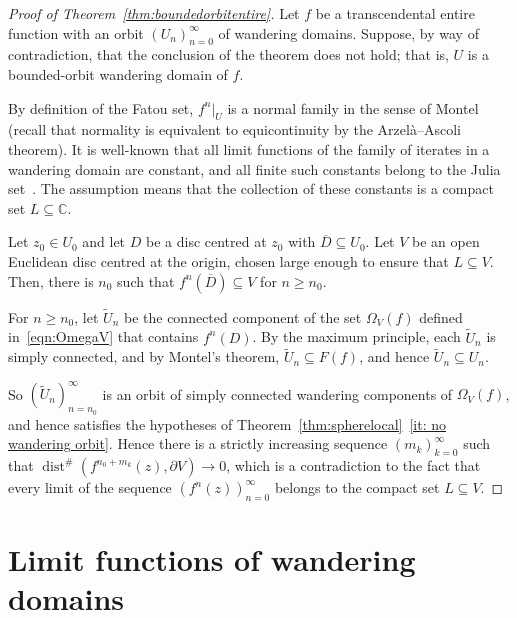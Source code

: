 \documentclass[12pt,a4paper,reqno]{amsart}
\theoremstyle{plain}
\renewcommand{\subset}{\subseteq}
\theoremstyle{definition}
\theoremstyle{remark}
\newcommand{\dist}{\operatorname{dist}}
\numberwithin{equation}{section}
\newcommand \C{\mathbb{C}}
\newcommand{\jw}[1]{{\color{cyan} #1}}
\begin{document}
\begin{proof}[Proof of Theorem~\ref{thm:boundedorbitentire}]
  Let $f$ be a transcendental entire function with an orbit $(U_n)_{n=0}^{\infty}$ of 
   wandering domains. Suppose, by way of
   contradiction, that the conclusion of the
   theorem does not hold; that is, $U$ is a bounded-orbit wandering domain of $f$. 

  By definition of the Fatou set, $f^n|_U$ is a normal family in the sense of Montel
   (recall that normality is equivalent to equicontinuity by the Arzel\`a--Ascoli theorem). 
   It is well-known that all limit functions of the family of iterates in a 
   wandering domain are constant, and all finite
   such 
   constants belong to the Julia set~\cite[p. 18]{bergweiler93}. The assumption means that 
   the collection of these constants is a compact set $L\subset\C$. 
   
  Let $z_0\in U_0$ and let $D$ be a disc centred at $z_0$ with $\overline{D}\subset  U_0$. 
   Let $V$ be an open Euclidean disc centred
   at the origin, chosen large enough to ensure 
   that $L\subset V$. Then, 
   there is $n_0$ such that $f^n(\overline{D})\subset V$ for $n\geq n_0$. 

 For $n\geq n_0$, let $\tilde{U}_n$ be the connected  component of the set $\Omega_V(f)$ defined 
 in~\eqref{eqn:OmegaV} that contains $f^n(D)$. By the maximum principle,
   each $\tilde{U}_n$ is simply connected, and by Montel's theorem,
   $\tilde{U}_n\subset F(f)$, and hence $\tilde{U}_n\subset U_n$. 

 So $(\tilde{U}_n)_{n=n_0}^{\infty}$ is an orbit of
  simply connected wandering components of $\Omega_V(f)$, and
  hence satisfies the hypotheses of 
  Theorem~\ref{thm:spherelocal}~\ref{it: no wandering orbit}.
  Hence there is a strictly increasing 
  sequence $(m_k)_{k=0}^{\infty}$
  such that $\dist^{\#}(f^{n_0+m_k}(z),\partial V)\to 0$, which is a contradiction to the 
  fact that every limit of the sequence $(f^{n}(z))_{n=0}^{\infty}$ belongs
  to the compact set $L\subset V$.
\end{proof}
\jw{
\section{Limit functions of wandering domains}
}



\end{document}
